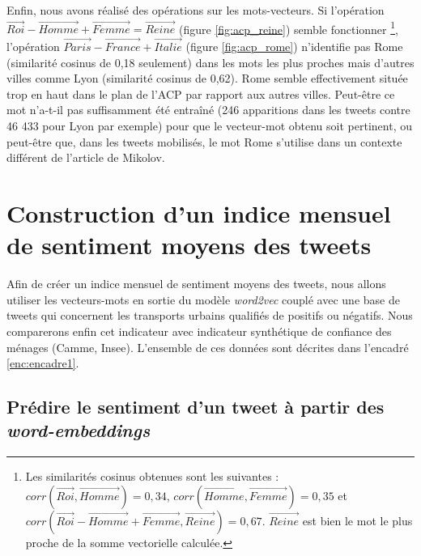 \documentclass[11pt,french,french]{article}
\let\rmarkdownfootnote\footnote%
\def\footnote{\protect\rmarkdownfootnote}
\begin{document}
Enfin, nous avons réalisé des opérations sur les mots-vecteurs.
Si l'opération \(\overrightarrow{Roi} - \overrightarrow{Homme} + \overrightarrow{Femme} = \overrightarrow{Reine}\) (figure \ref{fig:acp_reine}) semble fonctionner
\footnote{Les similarités cosinus obtenues sont les suivantes : \(corr(\overrightarrow{Roi}, \overrightarrow{Homme}) = 0,34\), \(corr(\overrightarrow{Homme}, \overrightarrow{Femme}) = 0,35\) et \(corr(\overrightarrow{Roi} - \overrightarrow{Homme} + \overrightarrow{Femme} , \overrightarrow{Reine}) = 0,67\). \(\overrightarrow{Reine}\) est bien le mot le plus proche de la somme vectorielle calculée.}, l'opération \(\overrightarrow{Paris} - \overrightarrow{France} + \overrightarrow{Italie}\) (figure \ref{fig:acp_rome}) n'identifie pas \og Rome \fg{} (similarité cosinus de 0,18 seulement) dans les mots les plus proches mais d'autres villes comme \og Lyon \fg{} (similarité cosinus de 0,62).
\og Rome \fg{} semble effectivement située \og trop en haut\fg{} dans le plan de l'ACP par rapport aux autres villes.
Peut-être ce mot n'a-t-il pas suffisamment été entraîné (246 apparitions dans les tweets contre 46 433 pour Lyon par exemple) pour que le vecteur-mot obtenu soit pertinent, ou peut-être que, dans les tweets mobilisés, le mot \og Rome \fg{} s'utilise dans un contexte différent de l'article de Mikolov.

\hypertarget{sec:sentimentalAnalysis}{%
\section{Construction d'un indice mensuel de sentiment moyens des tweets}\label{sec:sentimentalAnalysis}}

Afin de créer un indice mensuel de sentiment moyens des tweets, nous allons utiliser les vecteurs-mots en sortie du modèle \emph{word2vec} couplé avec une base de tweets qui concernent les transports urbains qualifiés de positifs ou négatifs.
Nous comparerons enfin cet indicateur avec indicateur synthétique de confiance des ménages (Camme, Insee). L'ensemble de ces données sont décrites dans l'encadré \ref{enc:encadre1}.

\hypertarget{pruxe9dire-le-sentiment-dun-tweet-uxe0-partir-des-word-embeddings}{%
\subsection{\texorpdfstring{Prédire le sentiment d'un tweet à partir des \emph{word-embeddings}}{Prédire le sentiment d'un tweet à partir des word-embeddings}}\label{pruxe9dire-le-sentiment-dun-tweet-uxe0-partir-des-word-embeddings}}
\end{document}
